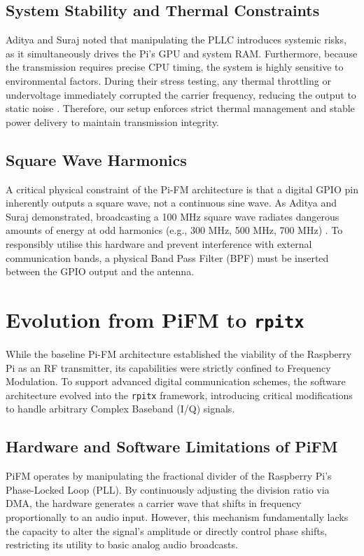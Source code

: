 \documentclass[conference]{IEEEtran}
\begin{document}
\subsection{System Stability and Thermal Constraints}
Aditya and Suraj noted that manipulating the PLLC introduces systemic risks, as it simultaneously drives the Pi's GPU and system RAM. Furthermore, because the transmission requires precise CPU timing, the system is highly sensitive to environmental factors. During their stress testing, any thermal throttling or undervoltage immediately corrupted the carrier frequency, reducing the output to static noise \cite{hw_analysis}. Therefore, our setup enforces strict thermal management and stable power delivery to maintain transmission integrity.

\subsection{Square Wave Harmonics}
A critical physical constraint of the Pi-FM architecture is that a digital GPIO pin inherently outputs a square wave, not a continuous sine wave. As Aditya and Suraj demonstrated, broadcasting a 100 MHz square wave radiates dangerous amounts of energy at odd harmonics (e.g., 300 MHz, 500 MHz, 700 MHz) \cite{hw_analysis}. To responsibly utilise this hardware and prevent interference with external communication bands, a physical Band Pass Filter (BPF) must be inserted between the GPIO output and the antenna.


\section{Evolution from PiFM to \texttt{rpitx}}
While the baseline Pi-FM architecture established the viability of the Raspberry Pi as an RF transmitter, its capabilities were strictly confined to Frequency Modulation. To support advanced digital communication schemes, the software architecture evolved into the \texttt{rpitx} framework, introducing critical modifications to handle arbitrary Complex Baseband (I/Q) signals.

\subsection{Hardware and Software Limitations of PiFM}
PiFM operates by manipulating the fractional divider of the Raspberry Pi's Phase-Locked Loop (PLL). By continuously adjusting the division ratio via DMA, the hardware generates a carrier wave that shifts in frequency proportionally to an audio input. However, this mechanism fundamentally lacks the capacity to alter the signal's amplitude or directly control phase shifts, restricting its utility to basic analog audio broadcasts. 
\end{document}
